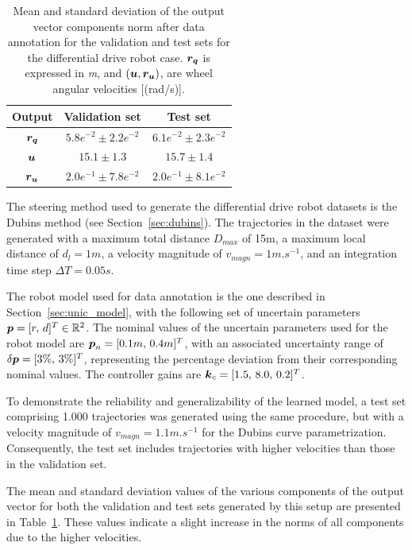 \begin{table}[htp]
    \centering
    \begin{tabular}{ | c | c || c |}
    \hline
      \textbf{Output}  & \textbf{Validation set}  & \textbf{Test set} \\ \hline
    $\boldsymbol{r_q}$ & $5.8e^{-2} \pm 2.2e^{-2}$ & $6.1e^{-2} \pm 2.3e^{-2}$ \\ \hline
    $\boldsymbol{u}$ & $15.1 \pm 1.3$ & $15.7 \pm 1.4$ \\ \hline
    $\boldsymbol{r_u}$ & $2.0e^{-1} \pm 7.8e^{-2}$ & $2.0e^{-1} \pm 8.1e^{-2}$ \\ \hline
\end{tabular}
\caption{
Mean and standard deviation of the output vector components norm after data annotation for the validation and test sets for the differential drive robot case.
$\boldsymbol{r_q}$ is expressed in \emph{m}, and $(\boldsymbol{u}, \boldsymbol{r_u})$, are wheel angular velocities [(rad/s)].}
 \label{tab:datas_stats_unic}
\end{table}

The steering method used to generate the differential drive robot datasets is the Dubins method (see Section~\ref{sec:dubins}).
The trajectories in the dataset were generated with a maximum total distance $D_{max}$ of 15m, a maximum local distance of $d_l = 1m$, a velocity magnitude of $v_{magn} = 1 m.s^{-1}$, and an integration time step $\Delta T = 0.05s$. 

The robot model used for data annotation is the one described in Section~\ref{sec:unic_model}, with the following set of uncertain parameters $\boldsymbol{p} = [r, \, d]^T \in \mathbb{R}^{2}$.
The nominal values of the uncertain parameters used for the robot model are  $\boldsymbol{p}_n = [0.1m, \, 0.4m]^T$, with an associated uncertainty range of $\delta\boldsymbol{p} = [3\%, \, 3\%]^T$, representing the percentage deviation from their corresponding nominal values.
The controller gains are $\boldsymbol{k}_c = [1.5, \, 8.0, \, 0.2]^T$.

To demonstrate the reliability and generalizability of the learned model, a test set comprising 1.000 trajectories was generated using the same procedure, but with a velocity magnitude of $v_{magn} = 1.1 m.s^{-1}$ for the Dubins curve parametrization. 
Consequently, the test set includes trajectories with higher velocities than those in the validation set.

The mean and standard deviation values of the various components of the output vector for both the validation and test sets generated by this setup are presented in Table~\ref{tab:datas_stats_unic}. 
These values indicate a slight increase in the norms of all components due to the higher velocities.

